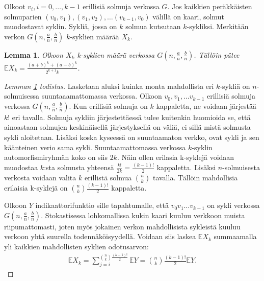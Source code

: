 \documentclass[finnish,12pt,a4paper,pdftex,sci,utf8]{aaltothesis}
\newtheorem{lemma}{Lemma}
\begin{document}
Olkoot $v_i, i = 0, \ldots, k-1$ erillisiä solmuja verkossa $G$. Jos kaikkien peräkkäisten solmuparien $(v_0, v_1), (v_1, v_2), \ldots (v_{k-1}, v_0)$ välillä on kaari, solmut muodostavat syklin. Sykliä, jossa on $k$ solmua kutsutaan $k$-sykliksi. Merkitään verkon $G(n, \frac{a}{n}, \frac{b}{n})$ $k$-syklien määrää $X_k$.

\begin{lemma}
	\label{lemma:k-syklit_odotus}
	Olkoon $X_k$ k-syklien määrä verkossa $G(n,\frac{a}{n},\frac{b}{n})$. Tällöin pätee $\mathbb{E}X_k = \frac{(a+b)^k + (a-b)^k}{2^{k+1}k}$.
\end{lemma}

\begin{proof}[Lemman \ref{lemma:k-syklit_odotus} todistus]
	Lasketaan aluksi kuinka monta mahdollista eri $k$-sykliä on $n$-solmuisessa suuntaaamattomassa verkossa. Olkoon $v_0, v_1, \ldots v_{k-1}$ erillisiä solmuja verkossa $G(n,\frac{a}{n},\frac{b}{n})$. Kun erillisiä solmuja on $k$ kappaletta, ne voidaan järjestää $k!$ eri tavalla. Solmuja sykliin järjestettäessä tulee kuitenkin huomioida se, että ainoastaan solmujen keskinäisellä järjestyksellä on väliä, ei sillä mistä solmusta sykli aloitetaan. Lisäksi koska kyseessä on suuntaamaton verkko, ovat sykli ja sen käänteinen verio sama sykli. Suuntaamattomassa verkossa $k$-syklin automorfismiryhmän koko on siis $2k$. Näin ollen erilasia k-syklejä voidaan muodostaa $k$:sta solmusta yhteensä $\frac{k!}{2k} = \frac{(k-1)!}{2}$ kappaletta. Lisäksi $n$-solmuisesta verkosta voidaan valita $k$ erillistä solmua $\binom{n}{k}$ tavalla. Tällöin mahdollisia erilaisia k-syklejä on $\binom{n}{k} \frac{(k-1)!}{2}$ kappaletta.

	Olkoon $Y$ indikaattorifunktio sille tapahtumalle, että $v_0 v_1 \ldots v_{k-1}$ on sykli verkossa $G(n,\frac{a}{n}, \frac{b}{n})$. Stokastisessa lohkomallissa kukin kaari kuuluu verkkoon muista riipumattomasti, joten myös jokainen verkon mahdollisista sykleistä kuuluu verkoon yhtä suurella todennäköisyydellä. Voidaan siis laskea $\mathbb{E}X_k$ summaamalla yli kaikkien mahdollisten syklien odotusarvon:
	\begin{align*}
		\mathbb{E} X_k = \sum_{j = i}^{\binom{n}{k} \frac{(k-1)!}{2}} \mathbb{E} Y = \binom{n}{k} \frac{(k-1)!}{2} \mathbb{E} Y.
	\end{align*}


\end{proof}
\end{document}
